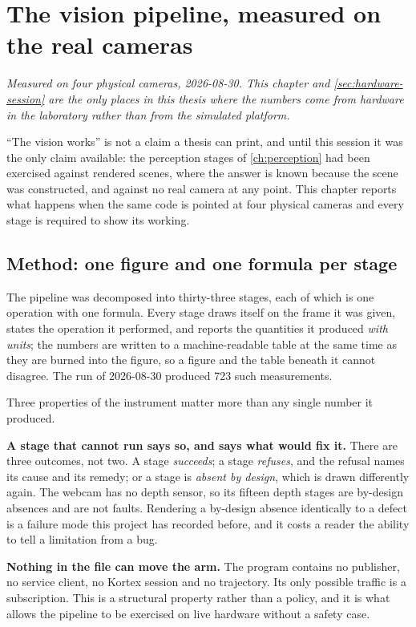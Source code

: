 \chapter{The vision pipeline, measured on the real cameras}
\label{ch:vision}

\emph{Measured on four physical cameras, 2026-08-30. This chapter and
\cref{sec:hardware-session} are the only places in this thesis where the
numbers come from hardware in the laboratory rather than from the simulated
platform.}

\bigskip

``The vision works'' is not a claim a thesis can print, and until this session
it was the only claim available: the perception stages of \cref{ch:perception}
had been exercised against rendered scenes, where the answer is known because
the scene was constructed, and against no real camera at any point. This
chapter reports what happens when the same code is pointed at four physical
cameras and every stage is required to show its working.

\section{Method: one figure and one formula per stage}
\label{sec:vision-method}

The pipeline was decomposed into thirty-three stages, each of which is one
operation with one formula. Every stage draws itself on the frame it was
given, states the operation it performed, and reports the quantities it
produced \emph{with units}; the numbers are written to a machine-readable
table at the same time as they are burned into the figure, so a figure and the
table beneath it cannot disagree. The run of 2026-08-30 produced
\num{723} such measurements.

Three properties of the instrument matter more than any single number it
produced.

\textbf{A stage that cannot run says so, and says what would fix it.} There
are three outcomes, not two. A stage \emph{succeeds}; a stage
\emph{refuses}, and the refusal names its cause and its remedy; or a stage is
\emph{absent by design}, which is drawn differently again. The webcam has no
depth sensor, so its fifteen depth stages are by-design absences and are not
faults. Rendering a by-design absence identically to a defect is a failure
mode this project has recorded before, and it costs a reader the ability to
tell a limitation from a bug.

\textbf{Nothing in the file can move the arm.} The program contains no
publisher, no service client, no Kortex session and no trajectory. Its only
possible traffic is a subscription. This is a structural property rather than
a policy, and it is what allows the pipeline to be exercised on live hardware
without a safety case.


